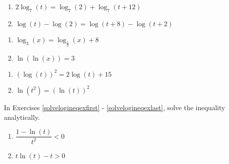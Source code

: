 \begin{multicols}{2}
\begin{enumerate}
\setcounter{enumi}{\value{HW}}

\item $2\log_{7}(t) = \log_{7}(2) + \log_{7}(t+12)$

\item $\log(t) - \log(2) = \log(t+8)  - \log(t+2)$

\setcounter{HW}{\value{enumi}}
\end{enumerate}
\end{multicols}

\begin{multicols}{2}
\begin{enumerate}
\setcounter{enumi}{\value{HW}}

\item $\log_{3}(x) = \log_{\frac{1}{3}}(x) + 8$

\item $\ln(\ln(x)) = 3$

\setcounter{HW}{\value{enumi}}
\end{enumerate}
\end{multicols}

\begin{multicols}{2}
\begin{enumerate}
\setcounter{enumi}{\value{HW}}

\item $\left(\log(t)\right)^2=2\log(t)+15$

\item $\ln(t^{2}) = (\ln(t))^{2}$ \label{solvelogeqexlast}

\setcounter{HW}{\value{enumi}}
\end{enumerate}
\end{multicols}


In Exercises \ref{solvelogineqexfirst} - \ref{solvelogineqexlast}, solve the inequality analytically.

\begin{multicols}{2}
\begin{enumerate}
\setcounter{enumi}{\value{HW}}

\item $\dfrac{1 - \ln(t)}{t^{2}} < 0$ \label{solvelogineqexfirst}
\item $t\ln(t) - t > 0$   


\setcounter{HW}{\value{enumi}}
\end{enumerate}
\end{multicols}

